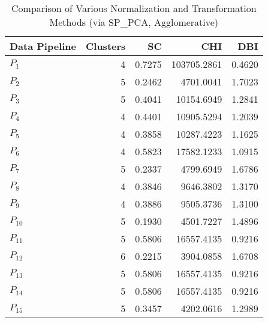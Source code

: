 \begin{table}[t]
\centering
\caption{Comparison of Various Normalization and Transformation Methods (via SP_PCA, Agglomerative)}
\label{tbl:Comparison_SP_PCA_Agglomerative_norm_tran}
\begin{tabular}{lrrrr}
\toprule
Data Pipeline &  Clusters &     SC &         CHI &    DBI \\
\midrule
      $P_{1}$ &         4 & 0.7275 & 103705.2861 & 0.4620 \\
      $P_{2}$ &         5 & 0.2462 &   4701.0041 & 1.7023 \\
      $P_{3}$ &         5 & 0.4041 &  10154.6949 & 1.2841 \\
      $P_{4}$ &         4 & 0.4401 &  10905.5294 & 1.2039 \\
      $P_{5}$ &         4 & 0.3858 &  10287.4223 & 1.1625 \\
      $P_{6}$ &         4 & 0.5823 &  17582.1233 & 1.0915 \\
      $P_{7}$ &         5 & 0.2337 &   4799.6949 & 1.6786 \\
      $P_{8}$ &         4 & 0.3846 &   9646.3802 & 1.3170 \\
      $P_{9}$ &         4 & 0.3886 &   9505.3736 & 1.3100 \\
     $P_{10}$ &         5 & 0.1930 &   4501.7227 & 1.4896 \\
     $P_{11}$ &         5 & 0.5806 &  16557.4135 & 0.9216 \\
     $P_{12}$ &         6 & 0.2215 &   3904.0858 & 1.6708 \\
     $P_{13}$ &         5 & 0.5806 &  16557.4135 & 0.9216 \\
     $P_{14}$ &         5 & 0.5806 &  16557.4135 & 0.9216 \\
     $P_{15}$ &         5 & 0.3457 &   4202.0616 & 1.2989 \\
\bottomrule
\end{tabular}
\end{table}
